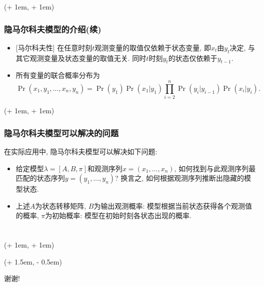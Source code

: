 \documentclass[xcolor=dvipsnames]{ctexbeamer}
\newcommand{\FrameTextCrono}[1]{
    \begin{textblock*}{\paperwidth}(\textwidth + 1em, \textheight + 1em)
        #1
    \end{textblock*}
}
\newcommand{\FrameTextResetCrono}[1]{
    \begin{textblock*}{\paperwidth}(\textwidth + 1.5em, \textheight - 0.5em)
        #1
    \end{textblock*}
}
\newcommand{\ResetCronoBox}{\resetcrono{\fbox{reset}}}
\let\oldframe\frame
\let\oldendframe\endframe
\renewenvironment{frame}
    {\oldframe\FrameTextCrono{\small\color{blue}{\crono}}}
    {\oldendframe}
\begin{document}
    \begin{frame}
        \frametitle{隐马尔科夫模型的介绍(续)}
        \begin{itemize}
            \item {[\alert{马尔科夫性}]}
                在任意时刻$t$观测变量的取值仅依赖于状态变量,
                即$x_{t}$由$y_{t}$决定,
                与其它观测变量及状态变量的取值无关.
                同时$t$时刻$y_{t}$的状态仅依赖于$y_{t-1}$.
            \item 所有变量的联合概率分布为
            \begin{equation}
                \Pr(x_{1}, y_{1}, \dotsc, x_{n}, y_{n}) =
                \Pr(y_{1})\Pr(x_{1}|y_{1})
                \prod_{i=2}^{n}\Pr(y_{i}|y_{i-1})\Pr(x_{i}|y_{i}).
            \end{equation}
        \end{itemize}
    \end{frame}

    \begin{frame}
        \frametitle{隐马尔科夫模型可以解决的问题}
        在实际应用中, 隐马尔科夫模型可以解决如下问题:
        \begin{itemize}
            \item 给定模型$\lambda=[A, B, \pi]$和观测序列$x=(x_{1}, \dotsc, x_{n})$,
                如何找到与此观测序列最匹配的状态序列$y=(y_{1}, \dotsc, y_{n})$?
                换言之, 如何根据观测序列推断出隐藏的模型状态.
            \item 上述$A$为状态转移矩阵, $B$为输出观测概率:
                模型根据当前状态获得各个观测值的概率, $\pi$为初始概率:
                模型在初始时刻各状态出现的概率.
        \end{itemize}
    \end{frame}

    \section*{}
    
    \begin{frame}
        \FrameTextResetCrono{\ResetCronoBox}
        \centering\huge{谢谢!}
    \end{frame}
\end{document}
